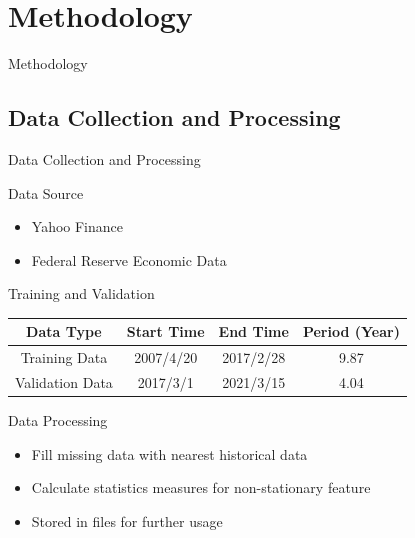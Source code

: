 \section{Methodology}
\begin{frame}{Methodology}
       \tableofcontents[sectionstyle=show/hide, hideothersubsections]
\end{frame}

\subsection{Data Collection and Processing}
\begin{frame}{Data Collection and Processing}
\begin{block}{Data Source}
\begin{itemize}
    \item Yahoo Finance
    \item Federal Reserve Economic Data
\end{itemize}
\end{block}
\begin{block}{Training and Validation}
    \begin{tabular}{||c|c|c|c||}
        \hline \hline
        Data Type & Start Time & End Time & Period (Year) \\ \hline \hline
        Training Data  &  2007/4/20 & 2017/2/28 & 9.87\\ \hline
        Validation Data & 2017/3/1 & 2021/3/15 & 4.04 \\ 
        \hline \hline
        \end{tabular}
\end{block}
\begin{block}{Data Processing}
\begin{itemize}
    \item Fill missing data with nearest historical data
    \item Calculate statistics measures for non-stationary feature
    \item Stored in files for further usage
\end{itemize}
\end{block}
\end{frame}


